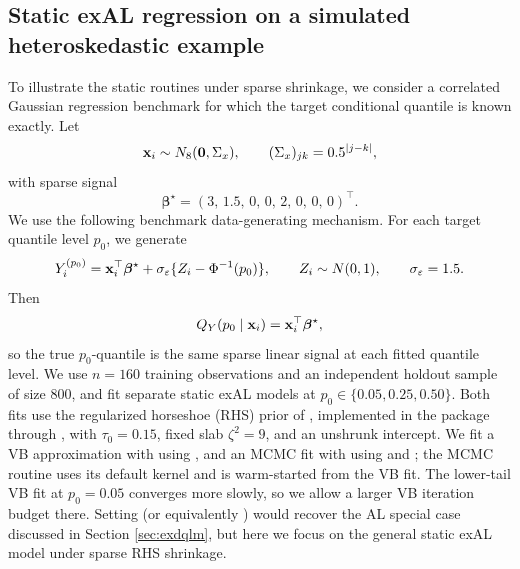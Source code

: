 \documentclass[jss]{jss}
\begin{document}

\subsection{Static exAL regression on a simulated heteroskedastic example}
\label{sec:ex4static}

To illustrate the static routines under sparse shrinkage, we consider a correlated Gaussian regression benchmark for which the target conditional quantile is known exactly. Let
\[
{\bf x}_i \sim N_8({\bf 0}, \Sigma_x),\qquad (\Sigma_x)_{jk} = 0.5^{|j-k|},
\]
with sparse signal
\[
\boldsymbol{\beta}^\star = (3,\,1.5,\,0,\,0,\,2,\,0,\,0,\,0)^\top.
\]
We use the following benchmark data-generating mechanism.
For each target quantile level \(p_0\), we generate
\[
Y_i^{(p_0)} = {\bf x}_i^\top \boldsymbol{\beta}^\star + \sigma_\varepsilon \{Z_i - \Phi^{-1}(p_0)\},
\qquad Z_i \sim N(0,1),\qquad \sigma_\varepsilon = 1.5.
\]
Then
\[
Q_Y(p_0 \mid {\bf x}_i) = {\bf x}_i^\top \boldsymbol{\beta}^\star,
\]
so the true \(p_0\)-quantile is the same sparse linear signal at each fitted quantile level. We use \(n = 160\) training observations and an independent holdout sample of size \(800\), and fit separate static exAL models at \(p_0 \in \{0.05,0.25,0.50\}\). Both fits use the regularized horseshoe (RHS) prior of \cite{nishimura2023shrunken}, implemented in the package through , with \(\tau_0 = 0.15\), fixed slab \(\zeta^2 = 9\), and an unshrunk intercept. We fit a VB approximation with  using , and an MCMC fit with  using  and ; the MCMC routine uses its default  kernel and is warm-started from the VB fit. The lower-tail VB fit at \(p_0 = 0.05\) converges more slowly, so we allow a larger VB iteration budget there. Setting  (or equivalently ) would recover the AL special case discussed in Section \ref{sec:exdqlm}, but here we focus on the general static exAL model under sparse RHS shrinkage.
\end{document}
